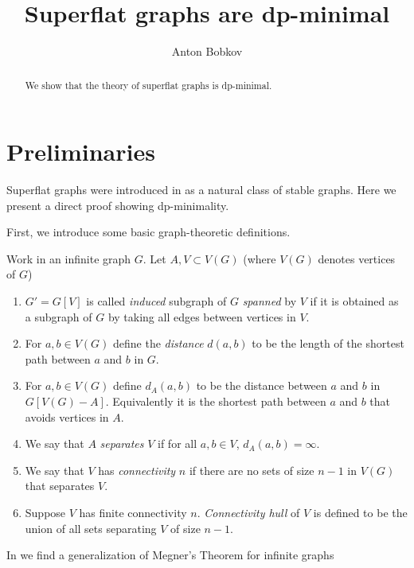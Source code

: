 \documentclass{amsart}
\begin{document}
\title{Superflat graphs are dp-minimal}
\author{Anton Bobkov}

\begin{abstract}
	We show that the theory of superflat graphs is dp-minimal.
\end{abstract}

\maketitle

\section{Preliminaries}

Superflat graphs were introduced in \cite{stable_graphs} as a natural class of stable graphs. Here we present a direct proof showing dp-minimality.

First, we introduce some basic graph-theoretic definitions.
\begin{Definition}
	Work in an infinite graph $G$. Let $A, V \subset V(G)$ (where $V(G)$ denotes vertices of $G$)
	\begin{enumerate}
		\item $G' = G[V]$ is called \emph{induced} subgraph of $G$ \emph{spanned} by $V$ if it is obtained as a subgraph of $G$ by taking all edges between vertices in $V$.
		\item For $a,b \in V(G)$ define the \emph{distance} $d(a,b)$ to be the length of the shortest path between $a$ and $b$ in $G$.
		\item For $a,b \in V(G)$ define $d_A(a,b)$ to be the distance between $a$ and $b$ in $G[V(G) - A]$. Equivalently it is the shortest path between $a$ and $b$ that avoids vertices in $A$.
		\item We say that $A$ \emph{separates} $V$ if for all $a,b \in V$, $d_A(a,b) = \infty$.
		\item We say that $V$ has \emph{connectivity} $n$ if there are no sets of size $n-1$ in $V(G)$ that separates $V$.
		\item Suppose $V$ has finite connectivity $n$. \emph{Connectivity hull} of $V$ is defined to be the union of all sets separating $V$ of size $n-1$.
	\end{enumerate}
\end{Definition}

In \cite{infinite_megner} we find a generalization of Megner's Theorem for infinite graphs
\end{document}
